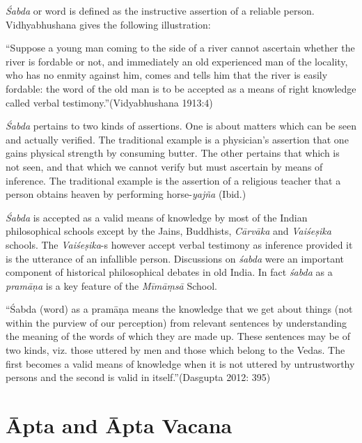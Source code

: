 \textit{Śabda} or word is defined as the instructive assertion of a reliable person. Vidhyabhushana gives the following illustration:

\newpage

\begin{myquote}
“Suppose a young man coming to the side of a river cannot ascertain whether the river is fordable or not, and immediately an old experienced man of the locality, who has no enmity against him, comes and tells him that the river is easily fordable: the word of the old man is to be accepted as a means of right knowledge called verbal testimony.”(Vidyabhushana 1913:4)
\end{myquote}

\textit{Śabda} pertains to two kinds of assertions. One is about matters which can be seen and actually verified. The traditional example is a physician’s assertion that one gains physical strength by consuming butter. The other pertains that which is not seen, and that which we cannot verify but must ascertain by means of inference. The traditional example is the assertion of a religious teacher that a person obtains heaven by performing horse-\textit{yajña} (Ibid.)

\textit{Śabda} is accepted as a valid means of knowledge by most of the Indian philosophical schools except by the Jains, Buddhists, \textit{Cārvāka} and \textit{Vaiśeṣika} schools. The \textit{Vaiśeṣika}-s however accept verbal testimony as inference provided it is the utterance of an infallible person. Discussions on \textit{śabda} were an important component of historical philosophical debates in old India. In fact \textit{śabda} as a \textit{pramāṇa} is a key feature of the \textit{Mīmāṃsā} School.

\begin{myquote}
“Śabda (word) as a pramāṇa means the knowledge that we get about things (not within the purview of our perception) from relevant sentences by understanding the meaning of the words of which they are made up. These sentences may be of two kinds, viz. those uttered by men and those which belong to the Vedas. The first becomes a valid means of knowledge when it is not uttered by untrustworthy persons and the second is valid in itself.”(Dasgupta 2012: 395)
\end{myquote}


\section*{Āpta and Āpta Vacana}

